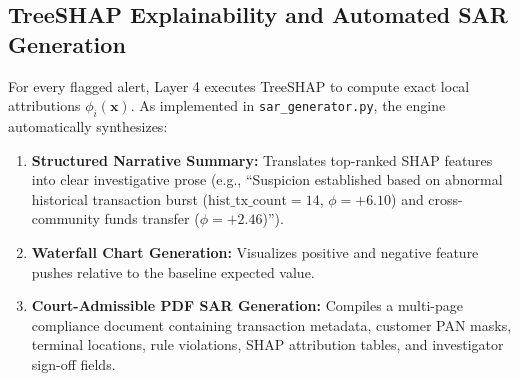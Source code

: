 \subsection{TreeSHAP Explainability and Automated SAR Generation}
For every flagged alert, Layer 4 executes TreeSHAP to compute exact local attributions $\phi_i(\mathbf{x})$. As implemented in \texttt{sar\_generator.py}, the engine automatically synthesizes:
\begin{enumerate}
    \item \textbf{Structured Narrative Summary:} Translates top-ranked SHAP features into clear investigative prose (e.g., ``Suspicion established based on abnormal historical transaction burst ($\text{hist\_tx\_count} = 14$, $\phi = +6.10$) and cross-community funds transfer ($\phi = +2.46$)'').
    \item \textbf{Waterfall Chart Generation:} Visualizes positive and negative feature pushes relative to the baseline expected value.
    \item \textbf{Court-Admissible PDF SAR Generation:} Compiles a multi-page compliance document containing transaction metadata, customer PAN masks, terminal locations, rule violations, SHAP attribution tables, and investigator sign-off fields.
\end{enumerate}

